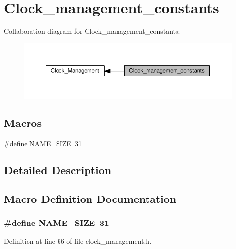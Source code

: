 \hypertarget{group___clock__management__constants}{}\section{Clock\+\_\+management\+\_\+constants}
\label{group___clock__management__constants}
Collaboration diagram for Clock\+\_\+management\+\_\+constants\+:\nopagebreak
\begin{figure}[H]
\begin{center}
\leavevmode
\includegraphics[width=350pt]{d5/db3/group___clock__management__constants}
\end{center}
\end{figure}
\subsection*{Macros}
\begin{DoxyCompactItemize}
\item 
\#define \hyperlink{group___clock__management__constants_ga834e9a379307f869a10f4da078be5786}{N\+A\+M\+E\+\_\+\+S\+I\+ZE}~31
\end{DoxyCompactItemize}


\subsection{Detailed Description}


\subsection{Macro Definition Documentation}
\subsubsection[{\texorpdfstring{N\+A\+M\+E\+\_\+\+S\+I\+ZE}{NAME_SIZE}}]{\setlength{\rightskip}{0pt plus 5cm}\#define N\+A\+M\+E\+\_\+\+S\+I\+ZE~31}\hypertarget{group___clock__management__constants_ga834e9a379307f869a10f4da078be5786}{}\label{group___clock__management__constants_ga834e9a379307f869a10f4da078be5786}


Definition at line 66 of file clock\+\_\+management.\+h.

